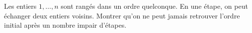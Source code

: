 Les entiers $1, \ldots, n$ sont rangés dans un ordre quelconque. En une étape, on peut échanger deux entiers voisins. Montrer qu'on ne peut jamais retrouver l'ordre initial après un nombre impair d'étapes.
